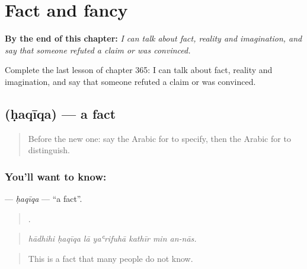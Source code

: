 
\chapter{Fact and fancy}
\label{ch:ar-fact-and-fancy}

\begin{chapteropening}
\textbf{By the end of this chapter:} \emph{I can talk about fact, reality and imagination, and say that someone refuted a claim or was convinced.}

Complete the last lesson of chapter 365: I can talk about fact, reality and imagination, and say that someone refuted a claim or was convinced.
\end{chapteropening}

\section[\texorpdfstring{\ar{حقيقة} (ḥaqīqa)}{حقيقة (ḥaqīqa)}]{ (ḥaqīqa) — a fact}

\label{lesson:AR-C365-haqiqa}



\begin{quote}
Before the new one: say the Arabic for to specify, then the Arabic for to distinguish.
\end{quote}

\subsection*{You'll want to know: }
\textbf{} — \emph{ḥaqīqa} — \textquotedblleft{}a fact\textquotedblright{}.

\begin{quote}
      .
\end{quote}

\begin{quote}
\emph{hādhihi ḥaqīqa lā yaʿrifuhā kathīr min an-nās.}
\end{quote}

\begin{quote}
This is a fact that many people do not know.
\end{quote}

